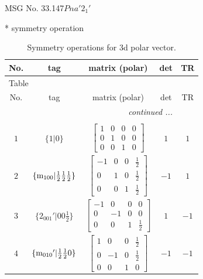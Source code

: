 \documentclass[fleqn,8pt]{jsarticle}
\begin{document}
\setcounter{MaxMatrixCols}{32}

\renewcommand{\tablename}{Table~}
\renewcommand{\figurename}{Figure~}
\begin{center}
\LARGE
MSG No. 33.147\quad$Pna'2_{1}'$
\end{center}
* symmetry operation
\renewcommand{\arraystretch}{1.3}
\begin{longtable}{ccccc}
\caption{Symmetry operations for 3d polar vector.}
 \\
 \hline \hline
No. & tag & matrix (polar) & det & TR \\ \hline \endfirsthead

\multicolumn{4}{l}{\tablename\ \thetable{}} \\
 \hline \hline
No. & tag & matrix (polar) & det & TR \\ \hline \endhead

 \hline \hline
\multicolumn{4}{r}{\footnotesize\it continued ...} \\ \endfoot

 \hline \hline
\multicolumn{4}{r}{} \\ \endlastfoot

$ 1 $ & $ \{1|0\} $ & $ \begin{bmatrix} 1 & 0 & 0 & 0 \\ 0 & 1 & 0 & 0 \\ 0 & 0 & 1 & 0 \end{bmatrix} $ & $ 1 $ & $ 1 $ \\ \hline
$ 2 $ & $ \{{\rm m}_{100}|\frac{1}{2} \frac{1}{2} \frac{1}{2}\} $ & $ \begin{bmatrix} -1 & 0 & 0 & \frac{1}{2} \\ 0 & 1 & 0 & \frac{1}{2} \\ 0 & 0 & 1 & \frac{1}{2} \end{bmatrix} $ & $ -1 $ & $ 1 $ \\ \hline
$ 3 $ & $ \{2{}_{001}{}'|0 0 \frac{1}{2}\} $ & $ \begin{bmatrix} -1 & 0 & 0 & 0 \\ 0 & -1 & 0 & 0 \\ 0 & 0 & 1 & \frac{1}{2} \end{bmatrix} $ & $ 1 $ & $ -1 $ \\ \hline
$ 4 $ & $ \{{\rm m}_{010}{}'|\frac{1}{2} \frac{1}{2} 0\} $ & $ \begin{bmatrix} 1 & 0 & 0 & \frac{1}{2} \\ 0 & -1 & 0 & \frac{1}{2} \\ 0 & 0 & 1 & 0 \end{bmatrix} $ & $ -1 $ & $ -1 $ \\
\end{longtable}
\end{document}
